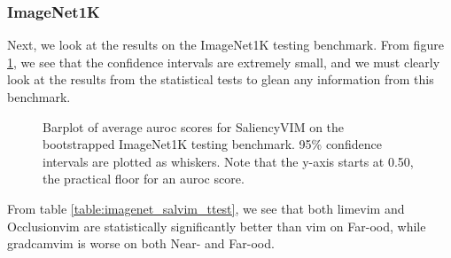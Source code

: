 \documentclass[UKenglish]{uiomasterthesis} %
\theoremstyle{definition}
\begin{document}
\newpage

\subsubsection{ImageNet1K}

Next, we look at the results on the ImageNet1K testing benchmark. From figure \ref{fig:imagenet_salvim_bootstrap_barplot}, we see that the confidence intervals are extremely small, and we must clearly look at the results from the statistical tests to glean any information from this benchmark.

\begin{figure}[hbtp]
    \begin{center}
        
    \end{center}
    \caption[ImageNet1K SaliencyVIM Bootstrap]{Barplot of average \ac{auroc} scores for SaliencyVIM on the bootstrapped ImageNet1K testing benchmark. 95\% confidence intervals are plotted as whiskers. Note that the y-axis starts at 0.50, the practical floor for an \ac{auroc} score.}
    \label{fig:imagenet_salvim_bootstrap_barplot}
\end{figure}

From table \ref{table:imagenet_salvim_ttest}, we see that both \ac{lime}\ac{vim} and Occlusion\ac{vim} are statistically significantly better than \ac{vim} on Far-\ac{ood}, while \ac{gradcam}\ac{vim} is worse on both Near- and Far-\ac{ood}.
\end{document}
